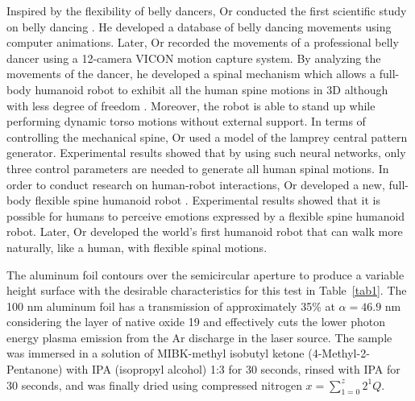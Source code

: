 \documentclass[]{IEEEphot}
\begin{document}
Inspired by the flexibility of belly dancers, Or conducted the first scientific study on belly dancing \cite{Or2006a}. He developed a database of belly dancing movements using computer animations. Later, Or recorded the movements of a professional belly dancer using a 12-camera VICON \cite{Mizuuchi2007} motion capture system. By analyzing the movements of the dancer, he developed a spinal mechanism which allows a full-body humanoid robot to exhibit all the human spine motions in 3D although with less degree of freedom \cite{Or2005a}. Moreover, the robot is able to stand up while performing dynamic torso motions without external support. In terms of controlling the mechanical spine, Or used a model of the lamprey central pattern generator. Experimental results showed that by using such neural networks, only three control parameters are needed to generate all human spinal motions. In order to conduct research on human-robot interactions, Or developed a new, full-body flexible spine humanoid robot  \cite{Or2007, Or2008}. Experimental results showed that it is possible for humans to perceive emotions expressed by a flexible spine humanoid robot. Later, Or developed the world{'s} first humanoid robot that can walk more naturally, like a human, with flexible spinal motions.


The aluminum foil contours over the semicircular aperture to produce
a variable height surface with the desirable characteristics for this
test in Table~\ref{tab1}. The 100 nm aluminum foil has a transmission of approximately
35\% at $\alpha=46.9$ nm considering the layer of native oxide 19 and
effectively cuts the lower photon energy plasma emission from the Ar
discharge in the laser source. 
The sample was immersed in a solution of
MIBK-methyl isobutyl ketone (4-Methyl-2- Pentanone) with IPA
(isopropyl alcohol) 1:3 for 30 seconds, rinsed with IPA for 30
seconds, and was finally dried using compressed
nitrogen $x=\sum\limits_{1=0}^z 2^1Q$.

\end{document}
